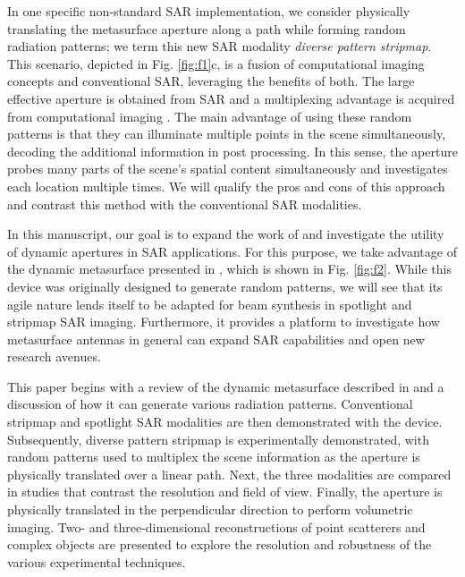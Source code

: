 \documentclass[journal]{IEEEtran}
\begin{document}
In one specific non-standard SAR implementation, we consider physically translating the metasurface aperture along a path while forming random radiation patterns; we term this new SAR modality \emph{diverse pattern stripmap}. This scenario, depicted in Fig. \ref{fig:f1}c, is a fusion of computational imaging concepts \cite{brady2009CSholo,brady2009optical,donoho2006CS,watts2014THzCS,Caorsi2000compImag} and conventional SAR, leveraging the benefits of both. The large effective aperture is obtained from SAR and a multiplexing advantage is acquired from computational imaging \cite{fenimore1978codedaperture}. The main advantage of using these random patterns is that they can illuminate multiple points in the scene simultaneously, decoding the additional information in post processing. In this sense, the aperture probes many parts of the scene's spatial content simultaneously and investigates each location multiple times. We will qualify the pros and cons of this approach and contrast this method with the conventional SAR modalities.

In this manuscript, our goal is to expand the work of \cite{sleasmanMarathon} and investigate the utility of dynamic apertures in SAR applications. For this purpose, we take advantage of the dynamic metasurface presented in \cite{sleasmanMarathon}, which is shown in Fig. \ref{fig:f2}. While this device was originally designed to generate random patterns, we will see that its agile nature lends itself to be adapted for beam synthesis in spotlight and stripmap SAR imaging. Furthermore, it provides a platform to investigate how metasurface antennas in general can expand SAR capabilities and open new research avenues.

This paper begins with a review of the dynamic metasurface described in \cite{sleasmanMarathon} and a discussion of how it can generate various radiation patterns. Conventional stripmap and spotlight SAR modalities are then demonstrated with the device. Subsequently, diverse pattern stripmap is experimentally demonstrated, with random patterns used to multiplex the scene information as the aperture is physically translated over a linear path. Next, the three modalities are compared in studies that contrast the resolution and field of view. Finally, the aperture is physically translated in the perpendicular direction to perform volumetric imaging. Two- and three-dimensional reconstructions of point scatterers and complex objects are presented to explore the resolution and robustness of the various experimental techniques.
\end{document}
